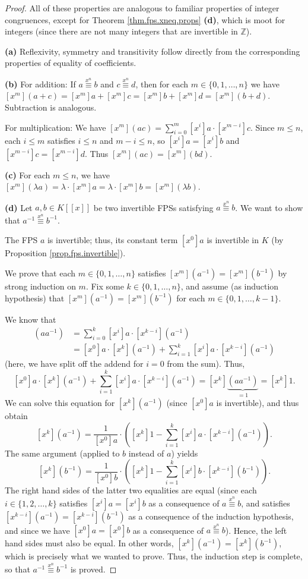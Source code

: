 \begin{proof}
All of these properties are analogous to familiar properties of integer
congruences, except for Theorem \ref{thm.fps.xneq.props} \textbf{(d)},
which is moot for integers (since there are not many integers that are
invertible in $\mathbb{Z}$).

\textbf{(a)} Reflexivity, symmetry and transitivity follow directly from the
corresponding properties of equality of coefficients.

\textbf{(b)} For addition: If $a\overset{x^{n}}{\equiv}b$ and
$c\overset{x^{n}}{\equiv}d$, then for each $m\in\{0,1,\ldots,n\}$ we have
$[x^m](a+c)=[x^m]a+[x^m]c=[x^m]b+[x^m]d=[x^m](b+d)$. Subtraction is
analogous.

For multiplication: We have
$[x^m](ac)=\sum_{i=0}^{m}[x^i]a\cdot[x^{m-i}]c$. Since $m\leq n$, each
$i\leq m$ satisfies $i\leq n$ and $m-i\leq n$, so $[x^i]a=[x^i]b$ and
$[x^{m-i}]c=[x^{m-i}]d$. Thus $[x^m](ac)=[x^m](bd)$.

\textbf{(c)} For each $m\leq n$, we have
$[x^m](\lambda a)=\lambda\cdot[x^m]a=\lambda\cdot[x^m]b=[x^m](\lambda b)$.

\textbf{(d)} Let $a,b\in K[[x]]$ be two invertible FPSs satisfying
$a\overset{x^{n}}{\equiv}b$. We want to show that
$a^{-1}\overset{x^{n}}{\equiv}b^{-1}$.

The FPS $a$ is invertible; thus, its constant term $[x^{0}]a$ is invertible
in $K$ (by Proposition \ref{prop.fps.invertible}).

We prove that each $m\in\{0,1,\ldots,n\}$ satisfies
$[x^{m}](a^{-1})=[x^{m}](b^{-1})$ by strong induction on $m$. Fix some
$k\in\{0,1,\ldots,n\}$, and assume (as induction hypothesis) that
$[x^{m}](a^{-1})=[x^{m}](b^{-1})$ for each $m\in\{0,1,\ldots,k-1\}$.

We know that
\begin{align*}
[x^{k}](aa^{-1})  &  =\sum_{i=0}^{k}[x^{i}]a\cdot[x^{k-i}](a^{-1})\\
&  =[x^{0}]a\cdot[x^{k}](a^{-1})+\sum_{i=1}^{k}[x^{i}]a\cdot[x^{k-i}](a^{-1})
\end{align*}
(here, we have split off the addend for $i=0$ from the sum). Thus,
\[
[x^{0}]a\cdot[x^{k}](a^{-1})+\sum_{i=1}^{k}[x^{i}]a\cdot
[x^{k-i}](a^{-1})=[x^{k}]\underbrace{(aa^{-1})}_{=1}=[x^{k}]1.
\]
We can solve this equation for $[x^{k}](a^{-1})$ (since $[x^{0}]a$ is
invertible), and thus obtain
\[
[x^{k}](a^{-1})=\dfrac{1}{[x^{0}]a}\cdot\left([x^{k}]1-\sum_{i=1}^{k}
[x^{i}]a\cdot[x^{k-i}](a^{-1})\right).
\]
The same argument (applied to $b$ instead of $a$) yields
\[
[x^{k}](b^{-1})=\dfrac{1}{[x^{0}]b}\cdot\left([x^{k}]1-\sum_{i=1}^{k}
[x^{i}]b\cdot[x^{k-i}](b^{-1})\right).
\]
The right hand sides of the latter two equalities are equal (since each
$i\in\{1,2,\ldots,k\}$ satisfies $[x^{i}]a=[x^{i}]b$ as a consequence of
$a\overset{x^{n}}{\equiv}b$, and satisfies $[x^{k-i}](a^{-1})=[x^{k-i}](b^{-1})$
as a consequence of the induction hypothesis, and since we have
$[x^{0}]a=[x^{0}]b$ as a consequence of $a\overset{x^{n}}{\equiv}b$).
Hence, the left hand sides must also be equal. In other words,
$[x^{k}](a^{-1})=[x^{k}](b^{-1})$, which is precisely what we wanted to
prove. Thus, the induction step is complete, so that
$a^{-1}\overset{x^{n}}{\equiv}b^{-1}$ is proved.


\end{proof}
